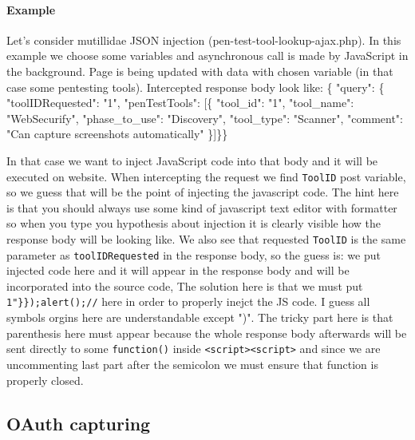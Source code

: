 \documentclass{article}[12pt]
\newcommand{\q}[1]{\texttt{#1}}
\begin{document}
\paragraph{Example}
Let's consider mutillidae JSON injection (pen-test-tool-lookup-ajax.php).
In this example we choose some variables and asynchronous call is made by JavaScript in the background.
Page is being updated with data with chosen variable (in that case some pentesting tools).
Intercepted response body look like: \newline
\{\newline
"query": \{\newline
"toolIDRequested": "1",\newline
"penTestTools": [\{\newline
"tool\_id": "1",\newline
"tool\_name": "WebSecurify",\newline
"phase\_to\_use": "Discovery",\newline
"tool\_type": "Scanner",\newline
"comment": "Can capture screenshots automatically"\newline
\}]\}\}

In that case we want to inject JavaScript code into that body and it will be executed on website.
When intercepting the request we find \q{ToolID} post variable, so we guess that will be the point of injecting the javascript code.
The hint here is that you should always use some kind of javascript text editor with formatter so when you type you hypothesis about injection it is clearly visible how the response body will be looking like.
We also see that requested \q{ToolID} is the same parameter as \q{toolIDRequested} in the response body, so the guess is: we put injected code here and it will appear in the response body and will be incorporated into the source code,
The solution here is that we must put \q{1"\}\});alert();//} here in order to properly inejct the JS code.
I guess all symbols orgins here are understandable except ")".
The tricky part here is that parenthesis here must appear because the whole response body afterwards will be sent directly to some \q{function()} inside \q{<script><\/script>} and since we are uncommenting last part after the semicolon we must ensure that function is properly closed.



\subsection{OAuth capturing}
\end{document}
